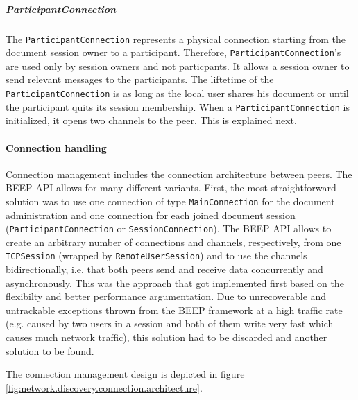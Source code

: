 \subparagraph{ParticipantConnection}
The \texttt{ParticipantConnection} represents a physical connection starting from the document session owner to a participant. Therefore, \texttt{ParticipantConnection}'s are used only by session owners and not particpants. It allows a session owner to send relevant messages to the participants. The liftetime of the \texttt{ParticipantConnection} is as long as the local user shares his document or until the participant quits its session membership. When a \texttt{ParticipantConnection} is initialized, it opens two channels to the peer. This is explained next.


\paragraph{Connection handling}
Connection management includes the connection architecture between peers. The BEEP API allows for many different variants. First, the most straightforward solution was to use one connection of type \texttt{MainConnection} for the document administration and one connection for each joined document session (\texttt{ParticipantConnection} or \texttt{SessionConnection}). The BEEP API allows to create an arbitrary number of connections and channels, respectively, from one \texttt{TCPSession} (wrapped by \texttt{RemoteUserSession}) and to use the channels bidirectionally, i.e. that both peers send and receive data concurrently and asynchronously. This was the approach that got implemented first based on the flexibilty and better performance argumentation. Due to unrecoverable and untrackable exceptions thrown from the BEEP framework at a high traffic rate (e.g. caused by two users in a session and both of them write very fast which causes much network traffic), this solution had to be discarded and another solution to be found. 

The connection management design is depicted in figure \ref{fig:network.discovery.connection.architecture}.

